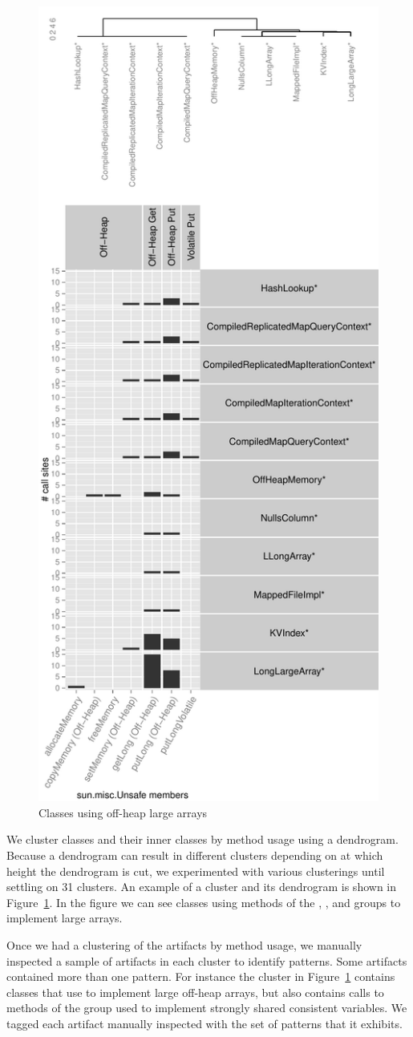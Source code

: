 \begin{figure}[!ht]
\centering
\includegraphics[width=0.55\columnwidth]{chapters/unsafe/classunit}
\caption{Classes using off-heap large arrays}
\label{fig:classunitfingerprint}
\end{figure}

We cluster classes and their inner classes by \unsafe{} method usage using a dendrogram.
Because a dendrogram can result in different clusters depending on at which height the dendrogram is cut,
we experimented with various clusterings until settling on 31 clusters.
An example of a cluster and its dendrogram is shown in Figure~\ref{fig:classunitfingerprint}.
In the figure we can see classes using methods of the , , and  groups to implement large arrays.

Once we had a clustering of the artifacts by method usage, we manually
inspected a sample of artifacts in each cluster to identify patterns.
Some artifacts contained more than one pattern.
For instance the cluster in Figure~\ref{fig:classunitfingerprint} contains
classes that use \unsafe{} to implement large off-heap arrays, but also
contains
calls to methods of the  group used to implement
strongly shared consistent variables.
We tagged each artifact manually inspected with the set of patterns that it exhibits.